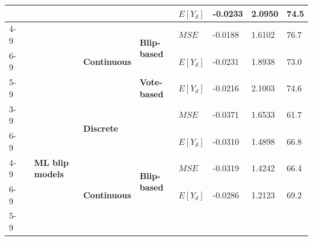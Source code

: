 \documentclass[a4paper,12pt]{article}
\begin{document}
\begin{table}[]
{\begin{tabular}{|l|l|l|l|l|l|l|l|l|}
                                &                                      &                                                              & \multicolumn{2}{l|}{}                                                       & \textbf{$E[Y_d]$} & -0.0233              & 2.0950                        & 74.5              \\ \cline{4-9} 
                                &                                      &                                                              & \multirow{3}{*}{\textbf{Continuous}} & \multirow{2}{*}{\textbf{Blip-based}} & \textbf{$MSE$}  & -0.0188              & 1.6102                        & 76.7              \\ \cline{6-9} 
                                &                                      &                                                              &                                      &                                      & \textbf{$E[Y_d]$} & -0.0231              & 1.8938                        & 73.0              \\ \cline{5-9} 
                                &                                      &                                                              &                                      & \textbf{Vote-based}                  & \textbf{$E[Y_d]$} & -0.0216              & 2.1003                        & 74.6              \\ \cline{3-9} 
                                &                                      & \multirow{5}{*}{\textbf{ML blip models}}                     & \multicolumn{2}{l|}{\multirow{2}{*}{\textbf{Discrete}}}                     & \textbf{$MSE$}  & -0.0371              & 1.6533                        & 61.7              \\ \cline{6-9} 
                                &                                      &                                                              & \multicolumn{2}{l|}{}                                                       & \textbf{$E[Y_d]$} & -0.0310              & 1.4898                        & 66.8              \\ \cline{4-9} 
                                &                                      &                                                              & \multirow{3}{*}{\textbf{Continuous}} & \multirow{2}{*}{\textbf{Blip-based}} & \textbf{$MSE$}  & -0.0319              & 1.4242                        & 66.4              \\ \cline{6-9} 
                                &                                      &                                                              &                                      &                                      & \textbf{$E[Y_d]$} & -0.0286              & 1.2123                        & 69.2              \\ \cline{5-9} 

\end{tabular}}
\end{table}
\end{document}
